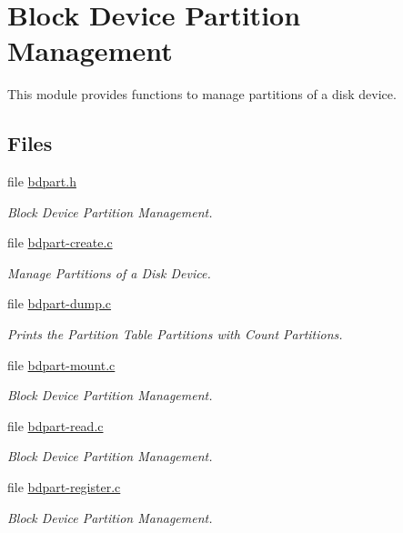\hypertarget{group__rtems__bdpart}{}\section{Block Device Partition Management}
\label{group__rtems__bdpart}


This module provides functions to manage partitions of a disk device.  


\subsection*{Files}
\begin{DoxyCompactItemize}
\item 
file \mbox{\hyperlink{bdpart_8h}{bdpart.\+h}}
\begin{DoxyCompactList}\small\item\em Block Device Partition Management. \end{DoxyCompactList}\item 
file \mbox{\hyperlink{bdpart-create_8c}{bdpart-\/create.\+c}}
\begin{DoxyCompactList}\small\item\em Manage Partitions of a Disk Device. \end{DoxyCompactList}\item 
file \mbox{\hyperlink{bdpart-dump_8c}{bdpart-\/dump.\+c}}
\begin{DoxyCompactList}\small\item\em Prints the Partition Table {\itshape Partitions} with {\itshape Count} Partitions. \end{DoxyCompactList}\item 
file \mbox{\hyperlink{bdpart-mount_8c}{bdpart-\/mount.\+c}}
\begin{DoxyCompactList}\small\item\em Block Device Partition Management. \end{DoxyCompactList}\item 
file \mbox{\hyperlink{bdpart-read_8c}{bdpart-\/read.\+c}}
\begin{DoxyCompactList}\small\item\em Block Device Partition Management. \end{DoxyCompactList}\item 
file \mbox{\hyperlink{bdpart-register_8c}{bdpart-\/register.\+c}}
\begin{DoxyCompactList}\small\item\em Block Device Partition Management. \end{DoxyCompactList}\item 

\end{DoxyCompactItemize}
